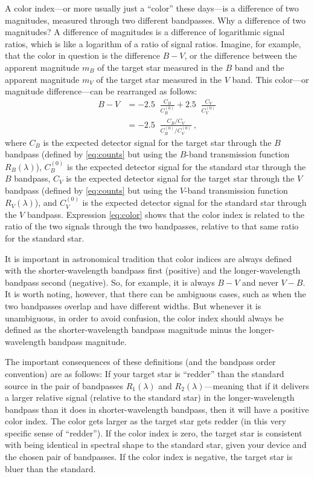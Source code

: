 \documentclass[10pt]{article}
\DeclareMathOperator{\logten}{log_{10}}
\begin{document}
A color index---or more usually just a ``color'' these days---is a difference of two magnitudes, measured through two different bandpasses.
Why a difference of two magnitudes?
A difference of magnitudes is a difference of logarithmic signal ratios, which is like a logarithm of a ratio of signal ratios.
Imagine, for example, that the color in question is the difference $B-V$, or the difference between the apparent magnitude $m_B$ of the target star measured in the $B$ band and the apparent magnitude $m_V$ of the target star measured in the $V$ band.
This color---or magnitude difference---can be rearranged as follows:
\begin{align}
    B-V &= -2.5\logten\frac{C_B}{C^{(0)}_B} + 2.5\logten\frac{C_V}{C^{(0)}_V}\\
        &= -2.5\logten\frac{C_B/C_V}{C^{(0)}_B/C^{(0)}_V}\label{eq:color} ~,
\end{align}
where $C_B$ is the expected detector signal for the target star through the $B$ bandpass (defined by \eqref{eq:counts} but using the $B$-band transmission function $R_B(\lambda)$),
$C^{(0)}_B$ is the expected detector signal for the standard star through the $B$ bandpass,
$C_V$ is the expected detector signal for the target star through the $V$ bandpass (defined by \eqref{eq:counts} but using the $V$-band transmission function $R_V(\lambda)$), and
$C^{(0)}_V$ is the expected detector signal for the standard star through the $V$ bandpass.
Expression \eqref{eq:color} shows that the color index is related to the ratio of the two signals through the two bandpasses, relative to that same ratio for the standard star.

It is important in astronomical tradition that color indices are always defined with the shorter-wavelength bandpass first (positive) and the longer-wavelength bandpass second (negative).
So, for example, it is always $B-V$ and never $V-B$.
It is worth noting, however, that there can be ambiguous cases, such as when the two bandpasses overlap and have different widths.
But whenever it is unambiguous, in order to avoid confusion, the color index should always be defined as the shorter-wavelength bandpass magnitude minus the longer-wavelength bandpass magnitude.

The important consequences of these definitions (and the bandpass order convention) are as follows:
If your target star is ``redder'' than the standard source in the pair of bandpasses $R_1(\lambda)$ and $R_2(\lambda)$---meaning that if it delivers a larger relative signal (relative to the standard star) in the longer-wavelength bandpass than it does in shorter-wavelength bandpass, then it will have a positive color index.
The color gets larger as the target star gets redder (in this very specific sense of ``redder'').
If the color index is zero, the target star is consistent with being identical in spectral shape to the standard star, given your device and the chosen pair of bandpasses.
If the color index is negative, the target star is bluer than the standard.
\end{document}
